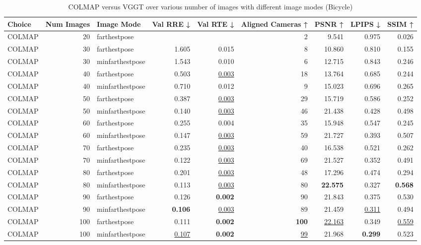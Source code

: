 \begin{table}[H]
\caption{COLMAP versus VGGT over various number of images with different image modes (Bicycle)}
\label{tab:01_num_images_image_mode_bicycle}
\centering
\scriptsize
\begin{tabular}{lrlrrrrrr}
\toprule
Choice & Num Images & Image Mode & Val RRE ↓ & Val RTE ↓ & Aligned Cameras ↑ & PSNR ↑ & LPIPS ↓ & SSIM ↑ \\
\midrule
COLMAP & 20 & farthestpose &  &  & 2 & 9.541 & 0.975 & 0.026 \\
COLMAP & 30 & farthestpose & 1.605 & 0.015 & 8 & 10.860 & 0.810 & 0.155 \\
COLMAP & 30 & minfarthestpose & 1.543 & 0.010 & 6 & 12.715 & 0.843 & 0.246 \\
COLMAP & 40 & farthestpose & 0.503 & \underline{0.003} & 18 & 13.764 & 0.685 & 0.244 \\
COLMAP & 40 & minfarthestpose & 0.710 & 0.012 & 9 & 15.023 & 0.696 & 0.265 \\
COLMAP & 50 & farthestpose & 0.387 & \underline{0.003} & 29 & 15.719 & 0.586 & 0.252 \\
COLMAP & 50 & minfarthestpose & 0.140 & \underline{0.003} & 46 & 21.438 & 0.428 & 0.498 \\
COLMAP & 60 & farthestpose & 0.255 & 0.004 & 35 & 15.948 & 0.547 & 0.245 \\
COLMAP & 60 & minfarthestpose & 0.147 & \underline{0.003} & 59 & 21.727 & 0.393 & 0.507 \\
COLMAP & 70 & farthestpose & 0.235 & \underline{0.003} & 40 & 16.538 & 0.521 & 0.262 \\
COLMAP & 70 & minfarthestpose & 0.122 & \underline{0.003} & 69 & 21.527 & 0.352 & 0.491 \\
COLMAP & 80 & farthestpose & 0.201 & \underline{0.003} & 48 & 17.296 & 0.474 & 0.294 \\
COLMAP & 80 & minfarthestpose & 0.113 & \underline{0.003} & 80 & \textbf{22.575} & 0.327 & \textbf{0.568} \\
COLMAP & 90 & farthestpose & 0.126 & \textbf{0.002} & 90 & 21.843 & 0.375 & 0.530 \\
COLMAP & 90 & minfarthestpose & \textbf{0.106} & \underline{0.003} & 89 & 21.459 & \underline{0.311} & 0.494 \\
COLMAP & 100 & farthestpose & 0.111 & \textbf{0.002} & \textbf{100} & \underline{22.163} & 0.349 & \underline{0.559} \\
COLMAP & 100 & minfarthestpose & \underline{0.107} & \textbf{0.002} & \underline{99} & 21.968 & \textbf{0.299} & 0.523 \\

\end{tabular}
\end{table}
